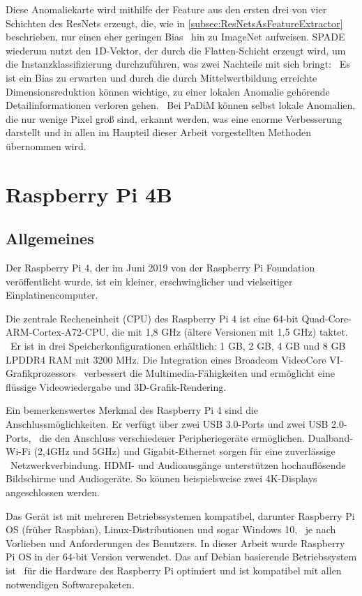Diese Anomaliekarte wird mithilfe der Feature aus den ersten drei von vier Schichten des ResNets erzeugt, die, wie in \ref{subsec:ResNetsAsFeatureExtractor} beschrieben, nur einen eher geringen \glqq Bias\grqq{}  \
hin zu ImageNet aufweisen. SPADE wiederum nutzt den 1D-Vektor, der durch die \glqq Flatten\grqq{}-Schicht erzeugt wird, um die Instanzklassifizierung durchzuführen, was zwei Nachteile mit sich bringt: \
Es ist ein Bias zu erwarten und durch die durch Mittelwertbildung erreichte Dimensionsreduktion können wichtige, zu einer lokalen Anomalie gehörende Detailinformationen verloren gehen. \
Bei PaDiM können selbst lokale Anomalien, die nur wenige Pixel groß sind, erkannt werden, was eine enorme Verbesserung darstellt und in allen im Haupteil dieser Arbeit vorgestellten Methoden übernommen wird. \
\section{Raspberry Pi 4B}\label{sec:RaspberryPi4B}
\subsection{Allgemeines}\label{subsec:RaspberryPi4BAllgemeines}
Der Raspberry Pi 4, der im Juni 2019 von der Raspberry Pi Foundation veröffentlicht wurde, ist ein kleiner, erschwinglicher und vielseitiger Einplatinencomputer. \

Die zentrale Recheneinheit (CPU) des Raspberry Pi 4 ist eine 64-bit Quad-Core-ARM-Cortex-A72-CPU, die mit 1,8 GHz (ältere Versionen mit 1,5 GHz) taktet. \  
Er ist in drei Speicherkonfigurationen erhältlich: 1 GB, 2 GB, 4 GB und 8 GB LPDDR4 RAM mit 3200 MHz. Die Integration eines Broadcom VideoCore VI-Grafikprozessors \
verbessert die Multimedia-Fähigkeiten und ermöglicht eine flüssige Videowiedergabe und 3D-Grafik-Rendering.

Ein bemerkenswertes Merkmal des Raspberry Pi 4 sind die Anschlussmöglichkeiten. Er verfügt über zwei USB 3.0-Ports und zwei USB 2.0-Ports, \ 
die den Anschluss verschiedener Peripheriegeräte ermöglichen. Dualband-Wi-Fi (2,4GHz und 5GHz) und Gigabit-Ethernet sorgen für eine zuverlässige \ 
Netzwerkverbindung. HDMI- und Audioausgänge unterstützen hochauflösende Bildschirme und Audiogeräte. So können beispielsweise zwei 4K-Displays angeschlossen werden. \

Das Gerät ist mit mehreren Betriebssystemen kompatibel, darunter Raspberry Pi OS (früher Raspbian), Linux-Distributionen und sogar Windows 10, \ 
je nach Vorlieben und Anforderungen des Benutzers. In dieser Arbeit wurde Raspberry Pi OS in der 64-bit Version verwendet. Das auf Debian basierende Betriebssystem ist \
für die Hardware des Raspberry Pi optimiert und ist kompatibel mit allen notwendigen Softwarepaketen. \

